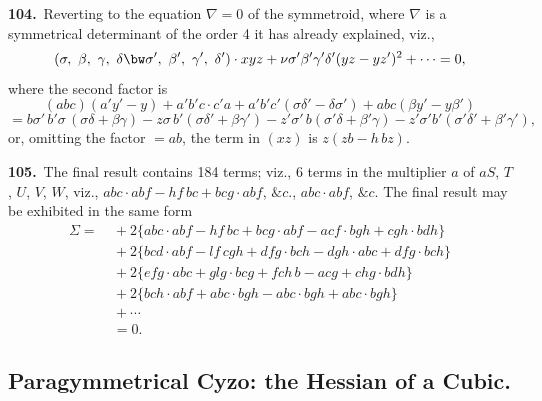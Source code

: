 \documentclass[11pt,a4paper]{article}
\begin{document}
\medskip

\textbf{104.}\ Reverting to the equation $\nabla = 0$ of the symmetroid, where $\nabla$ is a symmetrical determinant of the order 4 it has already explained, viz.,
\[
(\sigma,\ \beta,\ \gamma,\ \delta\bw\sigma',\ \beta',\ \gamma',\ \delta') \cdot xyz + \nu\sigma'\beta'\gamma'\delta'(yz - yz')^2 + \dots = 0,
\]
where the second factor is
\[
(abc)(a'y' - y) + a'b'c\cdot c'a + a'b'c'(\sigma\delta' - \delta\sigma') + abc(\beta y' - y\beta')
\]
\[
= b\sigma'\,b'\sigma\,(\sigma\delta + \beta\gamma) - z\sigma\,b'(\sigma\delta' + \beta\gamma') - z'\sigma'\,b(\sigma'\delta + \beta'\gamma) - z'\sigma'b'(\sigma'\delta' + \beta'\gamma'),
\]
or, omitting the factor $= ab$, the term in $(xz)$ is $z(zb - h\,bz)$.

\medskip

\textbf{105.}\ The final result contains 184 terms; viz., 6 terms in the multiplier $a$ of $aS$, $T$, $U$, $V$, $W$, viz., $abc \cdot abf - hf\,bc + bcg \cdot abf$, $\&c.$, $abc \cdot abf$, $\&c.$ The final result may be exhibited in the same form
\begin{align*}
\Sigma = &\ + 2\big\{abc\cdot abf - hf\,bc + bcg \cdot abf - acf \cdot bgh + cgh \cdot bdh\big\}\\
&\ + 2\big\{bcd\cdot abf - lf\,cgh + dfg \cdot bch - dgh \cdot abc + dfg \cdot bch\big\}\\
&\ + 2\big\{efg\cdot abc + glg \cdot bcg + fch\,b - acg + chg \cdot bdh\big\}\\
&\ + 2\big\{bch \cdot abf + abc \cdot bgh - abc \cdot bgh + abc \cdot bgh\big\}\\
&\ + \cdots\\
&\ = 0.
\end{align*}

\newpage
\setcounter{page}{175}

\subsection*{Paragymmetrical Cyzo: the Hessian of a Cubic.}
\end{document}
